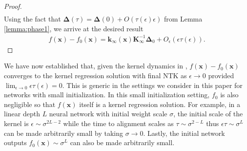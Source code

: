 \documentclass{article} %
\def\x{\bm x}
\begin{document}
\begin{appendix}
\begin{proof}
\begin{align}
\end{align}
Using the fact that $\bm\Delta(\tau) = \bm\Delta(0) + O(\tau(\epsilon) \epsilon)$ from Lemma \ref{lemma:phase1}, we arrive at the desired result
\begin{align}
    f(\x) - f_0(\x) = \bm k_{\infty}(\x) \bm K_{\infty}^{-1} \bm\Delta_0 + O_{\epsilon}(\epsilon \tau(\epsilon)) .
\end{align}
\end{proof}
We have now established that, given the kernel dynamics in , $f(\x) - f_0(\x)$ converges to the kernel regression solution with final NTK as $\epsilon \to 0$ provided $\lim_{\epsilon \to 0} \epsilon \tau(\epsilon) = 0$. This is generic in the settings we consider in this paper for networks with small initialization. In this small initialization setting, $f_0$ is also negligible so that $f(\x)$ itself is a kernel regression solution. For example, in a linear depth $L$ neural network with initial weight scale $\sigma$, the initial scale of the kernel is $\epsilon \sim \sigma^{2L-2}$ while the time to alignment scales as $\tau \sim \sigma^{2-L}$ thus $\epsilon \tau \sim \sigma^{L}$ can be made arbitrarily small by taking $\sigma \to 0$. Lastly, the initial network outputs $f_0(\x) \sim \sigma^L$ can also be made arbitrarily small. 






\end{appendix}
\end{document}
